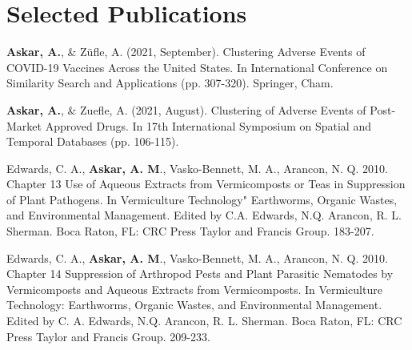 \documentclass[letterpaper]{twentysecondcv} %
\begin{document}
 
	

\newpage
\section{Selected Publications}


\textbf{Askar, A.}, & Züfle, A. (2021, September). Clustering Adverse Events of COVID-19 Vaccines Across the United States. In International Conference on Similarity Search and Applications (pp. 307-320). Springer, Cham.

\textbf{Askar, A.}, & Zuefle, A. (2021, August). Clustering of Adverse Events of Post-Market Approved Drugs. In 17th International Symposium on Spatial and Temporal Databases (pp. 106-115).

Edwards, C. A., \textbf{Askar, A. M}., Vasko-Bennett, M. A., Arancon, N. Q. 2010. Chapter 13 Use of Aqueous Extracts from Vermicomposts or Teas in Suppression of Plant Pathogens. In Vermiculture Technology" Earthworms, Organic Wastes, and Environmental Management. Edited by C.A. Edwards, N.Q. Arancon, R. L. Sherman. Boca Raton, FL: CRC Press Taylor and Francis Group. 183-207.

Edwards, C. A., \textbf{Askar, A. M}., Vasko-Bennett, M. A., Arancon, N. Q. 2010. Chapter 14 Suppression of Arthropod Pests and Plant Parasitic Nematodes by Vermicomposts and Aqueous Extracts from Vermicomposts. In Vermiculture Technology: Earthworms, Organic Wastes, and Environmental Management. Edited by C. A. Edwards, N.Q. Arancon, R. L. Sherman. Boca Raton, FL: CRC Press Taylor and Francis Group. 209-233. 
\end{document}
